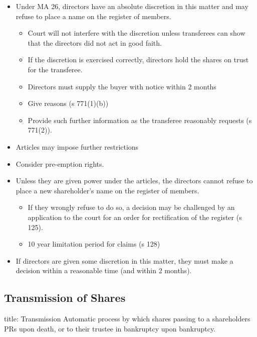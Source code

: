 \documentclass[
]{article}
\newenvironment{Shaded}{}{}
\newcommand{\NormalTok}[1]{#1}
\providecommand{\tightlist}{%
  \setlength{\itemsep}{0pt}\setlength{\parskip}{0pt}}
\begin{document}
\begin{itemize}
\tightlist
\item
  Under MA 26, directors have an absolute discretion in this matter and
  may refuse to place a name on the register of members.

  \begin{itemize}
  \tightlist
  \item
    Court will not interfere with the discretion unless transferees can
    show that the directors did not act in good faith.
  \item
    If the discretion is exercised correctly, directors hold the shares
    on trust for the transferee.
  \item
    Directors must supply the buyer with notice within 2 months
  \item
    Give reasons (s 771(1)(b))
  \item
    Provide such further information as the transferee reasonably
    requests (s 771(2)).
  \end{itemize}
\item
  Articles may impose further restrictions
\item
  Consider pre-emption rights.
\item
  Unless they are given power under the articles, the directors cannot
  refuse to place a new shareholder's name on the register of members.

  \begin{itemize}
  \tightlist
  \item
    If they wrongly refuse to do so, a decision may be challenged by an
    application to the court for an order for rectification of the
    register (s 125).
  \item
    10 year limitation period for claims (s 128)
  \end{itemize}
\item
  If directors are given some discretion in this matter, they must make
  a decision within a reasonable time (and within 2 months).
\end{itemize}

\hypertarget{transmission-of-shares}{%
\subsection{Transmission of Shares}\label{transmission-of-shares}}

\begin{Shaded}
\begin{Highlighting}[]
\NormalTok{title: Transmission}
\NormalTok{Automatic process by which shares passing to a shareholder\textquotesingle{}s PRs upon death, or to their trustee in bankruptcy upon bankruptcy. }
\end{Highlighting}
\end{Shaded}
\end{document}
